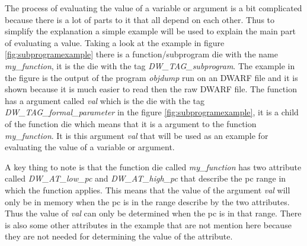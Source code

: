  


The process of evaluating the value of a variable or argument is a bit complicated because there is a lot of parts to it that all depend on each other.
Thus to simplify the explanation a simple example will be used to explain the main part of evaluating a value.
Taking a look at the example in figure \ref{fig:subprogramexample} there is a function/subprogram \gls{die} with the name \emph{my\_function}, it is the \gls{die} with the tag \emph{DW\_TAG\_subprogram}.
The example in the figure is the output of the program \emph{objdump} run on an \gls{DWARF} file and it is shown because it is much easier to read then the raw \gls{DWARF} file.
The function has a argument called \emph{val} which is the \gls{die} with the tag \emph{DW\_TAG\_formal\_parameter} in the figure \ref{fig:subprogramexample}, it is a child of the function \gls{die} which means that it is a argument to the function \emph{my\_function}.
It is this argument \emph{val} that will be used as an example for evaluating the value of a variable or argument.


A key thing to note is that the function \gls{die} called \emph{my\_function} has two attribute called \emph{DW\_AT\_low\_pc} and \emph{DW\_AT\_high\_pc} that describe the \gls{pc} range in which the function applies.
This means that the value of the argument \emph{val} will only be in memory when the \gls{pc} is in the range describe by the two attributes.
Thus the value of \emph{val} can only be determined when the \gls{pc} is in that range.
There is also some other attributes in the example that are not mention here because they are not needed for determining the value of the attribute.


